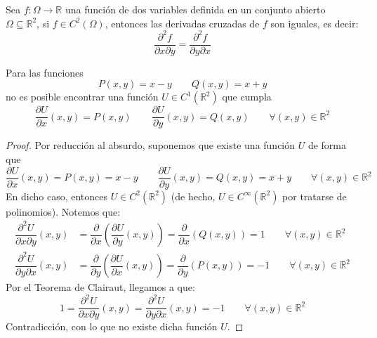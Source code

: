 \begin{teo}[de Clairaut]
    Sea $f:\Omega \rightarrow \mathbb{R}$ una función de dos variables definida en un conjunto abierto $\Omega\subseteq \mathbb{R}^2$, si $f\in C^2(\Omega)$, entonces las derivadas cruzadas de $f$ son iguales, es decir:
    \begin{equation*}
        \dfrac{\partial^2 f}{\partial x\partial y} = \dfrac{\partial^2 f}{\partial y\partial x}
    \end{equation*}
\end{teo}

\begin{ejemplo}
    Para las funciones
    \begin{equation*}
        P(x,y) = x-y \qquad Q(x,y) = x+y
    \end{equation*}
    no es posible encontrar una función $U\in C^1(\mathbb{R}^2)$ que cumpla
    \begin{equation*}
        \dfrac{\partial U}{\partial x}(x,y) = P(x,y) \qquad \dfrac{\partial U}{\partial y}(x,y) = Q(x,y) \qquad \forall (x,y)\in \mathbb{R}^2
    \end{equation*}
    \begin{proof}
        Por reducción al absurdo, suponemos que existe una función $U$ de forma que
    \begin{equation*}
        \dfrac{\partial U}{\partial x}(x,y) = P(x,y) = x-y \qquad \dfrac{\partial U}{\partial y}(x,y) = Q(x,y) = x+y \qquad \forall (x,y)\in \mathbb{R}^2
    \end{equation*}
    En dicho caso, entonces $U\in C^2(\mathbb{R}^2)$ (de hecho, $U\in C^\infty(\mathbb{R}^2)$ por tratarse de polinomios). Notemos que:
    \begin{align*}
        \dfrac{\partial^2 U}{\partial x\partial y}(x,y) &= \dfrac{\partial }{\partial x}\left(\dfrac{\partial U}{\partial y}(x,y)\right) = \dfrac{\partial }{\partial x}(Q(x,y)) = 1 \qquad \forall (x,y)\in \mathbb{R}^2 \\
        \dfrac{\partial^2 U}{\partial y\partial x}(x,y) &= \dfrac{\partial }{\partial y}\left(\dfrac{\partial U}{\partial x}(x,y)\right) = \dfrac{\partial }{\partial y}(P(x,y)) = -1 \qquad \forall (x,y)\in \mathbb{R}^2 
    \end{align*}
    Por el Teorema de Clairaut, llegamos a que:
    \begin{equation*}
        1 = \dfrac{\partial^2 U}{\partial x\partial y}(x,y) = \dfrac{\partial^2 U}{\partial y\partial x}(x,y) = -1 \qquad \forall (x,y)\in \mathbb{R}^2
    \end{equation*}
    Contradicción, con lo que no existe dicha función $U$.
    \end{proof}
\end{ejemplo}

